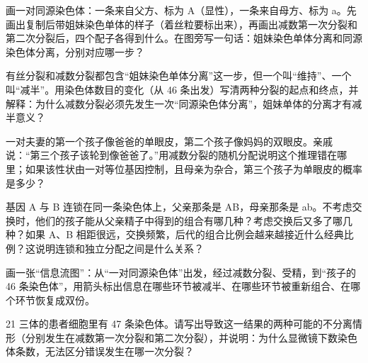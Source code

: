\begin{sikaoti}
\item 画一对同源染色体：一条来自父方、标为 A（显性），一条来自母方、标为 a。先画出复制后带姐妹染色单体的样子（着丝粒要标出来），再画出减数第一次分裂和第二次分裂后，四个配子各得到什么。在图旁写一句话：姐妹染色单体分离和同源染色体分离，分别对应哪一步？
\item 有丝分裂和减数分裂都包含“姐妹染色单体分离”这一步，但一个叫“维持”、一个叫“减半”。用染色体数目的变化（从 46 条出发）写清两种分裂的起点和终点，并解释：为什么减数分裂必须先发生一次“同源染色体分离”，姐妹单体的分离才有减半意义？
\item 一对夫妻的第一个孩子像爸爸的单眼皮，第二个孩子像妈妈的双眼皮。亲戚说：“第三个孩子该轮到像爸爸了。”用减数分裂的随机分配说明这个推理错在哪里；如果该性状由一对等位基因控制，且母亲为杂合，第三个孩子为单眼皮的概率是多少？
\item 基因 A 与 B 连锁在同一条染色体上，父亲那条是 AB，母亲那条是 ab。不考虑交换时，他们的孩子能从父亲精子中得到的组合有哪几种？考虑交换后又多了哪几种？如果 A、B 相距很远，交换频繁，后代的组合比例会越来越接近什么经典比例？这说明连锁和独立分配之间是什么关系？
\item 画一张“信息流图”：从“一对同源染色体”出发，经过减数分裂、受精，到“孩子的 46 条染色体”，用箭头标出信息在哪些环节被减半、在哪些环节被重新组合、在哪个环节恢复成双份。
\item 21 三体的患者细胞里有 47 条染色体。请写出导致这一结果的两种可能的不分离情形（分别发生在减数第一次分裂和第二次分裂），并说明：为什么显微镜下数染色体条数，无法区分错误发生在哪一次分裂？
\end{sikaoti}
